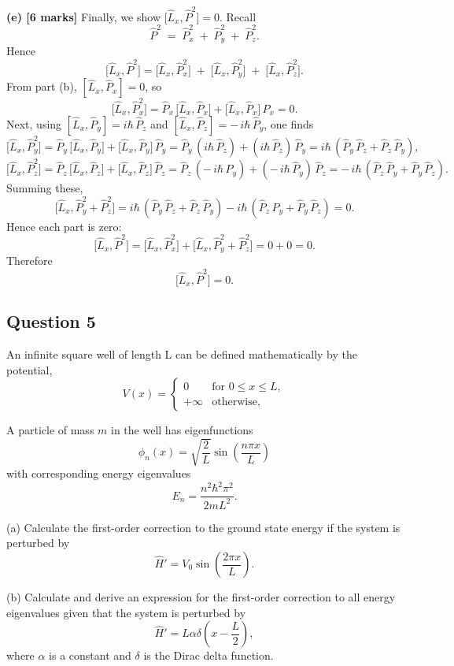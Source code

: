 \documentclass{article}
\begin{document}
\textbf{(e) [6 marks]} 
Finally, we show \(\bigl[\hat{L}_x,\hat{P}^2\bigr] = 0\). Recall
\[
\hat{P}^2 \;=\; \hat{P}_x^2 \;+\; \hat{P}_y^2 \;+\; \hat{P}_z^2.
\]
Hence
\[
\bigl[\hat{L}_x,\hat{P}^2\bigr] 
= \bigl[\hat{L}_x,\hat{P}_x^2\bigr] \;+\; \bigl[\hat{L}_x,\hat{P}_y^2\bigr] \;+\; \bigl[\hat{L}_x,\hat{P}_z^2\bigr].
\]
From part (b), \([\hat{L}_x, \hat{P}_x]=0\), so
\[
\bigl[\hat{L}_x,\hat{P}_x^2\bigr] 
= \hat{P}_x\,\bigl[\hat{L}_x,\hat{P}_x\bigr] + \bigl[\hat{L}_x,\hat{P}_x\bigr]\,\hat{P}_x = 0.
\]
Next, using \([\hat{L}_x,\hat{P}_y] = i\hbar\,\hat{P}_z\) and \([\hat{L}_x,\hat{P}_z] = -\,i\hbar\,\hat{P}_y\), one finds
\[
\bigl[\hat{L}_x,\hat{P}_y^2\bigr] 
= \hat{P}_y\,\bigl[\hat{L}_x,\hat{P}_y\bigr] + \bigl[\hat{L}_x,\hat{P}_y\bigr]\,\hat{P}_y 
= \hat{P}_y\,(i\hbar\,\hat{P}_z) + (i\hbar\,\hat{P}_z)\,\hat{P}_y 
= i\hbar\,(\hat{P}_y\,\hat{P}_z + \hat{P}_z\,\hat{P}_y),
\]
\[
\bigl[\hat{L}_x,\hat{P}_z^2\bigr] 
= \hat{P}_z\,\bigl[\hat{L}_x,\hat{P}_z\bigr] + \bigl[\hat{L}_x,\hat{P}_z\bigr]\,\hat{P}_z 
= \hat{P}_z\,(-\,i\hbar\,\hat{P}_y) + (-\,i\hbar\,\hat{P}_y)\,\hat{P}_z 
= -\,i\hbar\,(\hat{P}_z\,\hat{P}_y + \hat{P}_y\,\hat{P}_z).
\]
Summing these,
\[
\bigl[\hat{L}_x,\hat{P}_y^2 + \hat{P}_z^2\bigr] 
= i\hbar\,(\hat{P}_y\,\hat{P}_z + \hat{P}_z\,\hat{P}_y)
- i\hbar\,(\hat{P}_z\,\hat{P}_y + \hat{P}_y\,\hat{P}_z) = 0.
\]
Hence each part is zero:
\[
\bigl[\hat{L}_x,\hat{P}^2\bigr] 
= \bigl[\hat{L}_x,\hat{P}_x^2\bigr] + \bigl[\hat{L}_x,\hat{P}_y^2 + \hat{P}_z^2\bigr] 
= 0 + 0 = 0.
\]
Therefore 
\[
\bigl[\hat{L}_x,\hat{P}^2\bigr] = 0.
\]


\subsection{Question 5}
An infinite square well of length L can be defined mathematically by the potential,
\[
V(x) = 
\begin{cases} 
0 & \text{for } 0 \leq x \leq L, \\
+\infty & \text{otherwise},
\end{cases}
\]

A particle of mass \(m\) in the well has eigenfunctions
\[
\phi_n(x) = \sqrt{\frac{2}{L}} \sin\left(\frac{n \pi x}{L}\right)
\]
with corresponding energy eigenvalues
\[
E_n = \frac{n^2 \hbar^2 \pi^2}{2mL^2}.
\]

(a) Calculate the first-order correction to the ground state energy if the system is perturbed by
\[
\hat{H}' = V_0 \sin\left(\frac{2\pi x}{L}\right).
\]

(b) Calculate and derive an expression for the first-order correction to all energy eigenvalues given that the system is perturbed by
\[
\hat{H}' = L \alpha \delta\left(x - \frac{L}{2}\right),
\]
where \(\alpha\) is a constant and \(\delta\) is the Dirac delta function.
\end{document}
